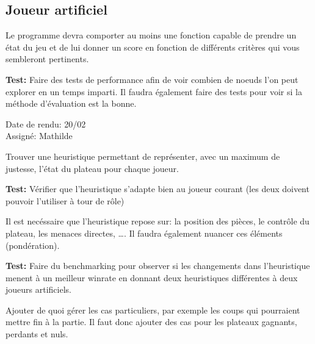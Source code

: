 \documentclass{article}
\begin{document}
\subsection{Joueur artificiel}

\begin{needbox}
    Le programme devra comporter au moins une fonction
    capable de prendre un état du jeu et de lui donner un score en
    fonction de différents critères qui vous sembleront pertinents.
    
    \textbf{Test:} Faire des tests de performance afin de voir combien
    de noeuds l'on peut explorer en un temps imparti. Il faudra également
    faire des tests pour voir si la méthode d'évaluation est la bonne. 
    \begin{duedatebox}
        Date de rendu: 20/02\\
        Assigné: Mathilde
    \end{duedatebox}
    \begin{subneedbox}
        Trouver une heuristique permettant de représenter, avec un 
        maximum de justesse, l'état du plateau pour chaque joueur.

        \textbf{Test:} Vérifier que l'heuristique s'adapte bien au joueur
        courant (les deux doivent pouvoir l'utiliser à tour de rôle)
    \end{subneedbox}
    \begin{subneedbox}
        Il est necéssaire que l'heuristique repose sur: la position des pièces, 
        le contrôle du plateau, les menaces directes, \ldots .
        Il faudra également nuancer ces éléments (pondération).

        \textbf{Test:} Faire du benchmarking pour observer si les changements
        dans l'heuristique menent à un meilleur winrate en donnant deux heuristiques
        différentes à deux joueurs artificiels.
    \end{subneedbox}
    \begin{subneedbox}
        Ajouter de quoi gérer les cas particuliers, par exemple les coups
        qui pourraient mettre fin à la partie. Il faut donc ajouter des cas
        pour les plateaux gagnants, perdants et nuls.
    \end{subneedbox}
\end{needbox}
\end{document}
